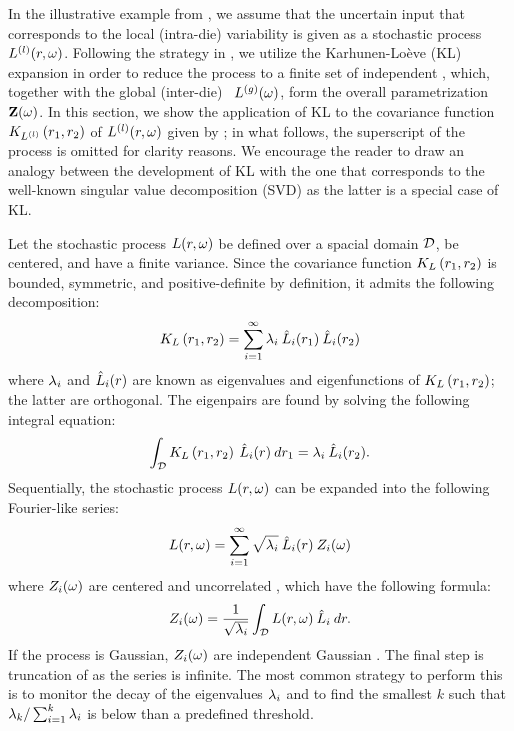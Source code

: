 In the illustrative example from , we assume that the uncertain input that corresponds to the local (intra-die) variability is given as a stochastic process $L^{(l)}(r, \omega)$. Following the strategy in , we utilize the Karhunen-Lo\`{e}ve (KL) expansion in order to reduce the process to a finite set of independent \rvs, which, together with the global (inter-die) \rv\ ${L^{(g)}}(\omega)$, form the overall parametrization $\mathbf{Z}(\omega)$. In this section, we show the application of KL to the covariance function $K_{L^{(l)}}\left(r_1, r_2\right)$ of $L^{(l)}(r, \omega)$ given by  \cite{maitre2010, ghanem1991, ghanta2006}; in what follows, the superscript of the process is omitted for clarity reasons. We encourage the reader to draw an analogy between the development of KL with the one that corresponds to the well-known singular value decomposition (SVD) as the latter is a special case of KL.

Let the stochastic process $L(r, \omega)$ be defined over a spacial domain $\mathcal{D}$, be centered, and have a finite variance. Since the covariance function $K_{L}\left(r_1, r_2\right)$ is bounded, symmetric, and positive-definite by definition, it admits the following decomposition:
\[
  K_{L}\left(r_1, r_2\right) = \sum_{i = 1}^\infty \lambda_i \: \hat{L}_i(r_1) \: \hat{L}_i(r_2)
\]
where $\lambda_i$ and $\hat{L}_i(r)$ are known as eigenvalues and eigenfunctions of $K_{L}\left(r_1, r_2\right)$; the latter are orthogonal. The eigenpairs are found by solving the following integral equation:
\begin{equation} \elabel{kl-eigenpairs}
  \int_\domain \fCov{\Leff}{r_1, r_2} \: \klf{\Leff}_i (r) \: dr_1 = \klv_i \: \klf{\Leff}_i(r_2).
\end{equation}
Sequentially, the stochastic process $L(r, \omega)$ can be expanded into the following Fourier-like series:
\begin{equation} \elabel{kl-expansion}
  \Leff(r, \o) = \sum_{i = 1}^\infty \sqrt{\lambda_i} \: \pcc{\Leff}_i(r) \: \Z_i(\o)
\end{equation}
where $Z_i(\omega)$ are centered and uncorrelated \rvs, which have the following formula:
\[
  Z_i(\omega) = \frac{1}{\sqrt{\lambda_i}} \int_{\mathcal{D}} L(r, \omega) \: \hat{L}_i \: dr.
\]
If the process is Gaussian, $Z_i(\omega)$ are independent Gaussian \rvs. The final step is truncation of  as the series is infinite. The most common strategy to perform this is to monitor the decay of the eigenvalues $\lambda_i$ and to find the smallest $k$ such that $\lambda_k / \sum_{i = 1}^k \lambda_i$ is below than a predefined threshold.

